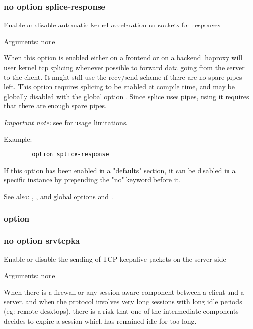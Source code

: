 {\subsubsection*{no option splice-response}


  Enable or disable automatic kernel acceleration on sockets for responses


  Arguments: none

  When this option is enabled either on a frontend or on a backend, haproxy
  will user kernel tcp splicing whenever possible to forward data going from
  the server to the client. It might still use the recv/send scheme if there
  are no spare pipes left. This option requires splicing to be enabled at
  compile time, and may be globally disabled with the global option .
  Since splice uses pipes, using it requires that there are enough spare pipes.

  \emph{Important note:} see  for usage limitations.

  Example:
  \begin{verbatim}
        option splice-response
  \end{verbatim}

  If this option has been enabled in a "defaults" section, it can be disabled
  in a specific instance by prepending the "no" keyword before it.

  See also: , , and global options
              and .

\subsubsection[srvtcpka]{option }
\subsubsection*{no option srvtcpka}


  Enable or disable the sending of TCP keepalive packets on the server side


  Arguments: none

  When there is a firewall or any session-aware component between a client and
  a server, and when the protocol involves very long sessions with long idle
  periods (eg: remote desktops), there is a risk that one of the intermediate
  components decides to expire a session which has remained idle for too long.

}
